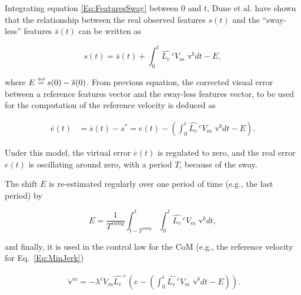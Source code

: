 

Integrating equation \ref{Eq:FeaturesSway} between $0$ and $t$, Dune et al. have shown that the relationship between the real observed features $s(t)$ and the ``sway-less'' features $\bar{s}(t)$ can be written as

\begin{equation}
s(t) = \overline{s}(t) + \int_{0}^{t} {{\widehat{ L_e}}} \, ^c  V_{m} \text{ v}^b dt - E,
\end{equation}

where $E \stackrel{\mbox{\tiny def}}{=} s(0)-\overline{s}(0)$. From previous equation, the corrected visual error between a reference features vector and the sway-less features vector, to be used for the computation of the reference velocity is deduced as

\begin{align}
\overline{e}(t)&=\overline{s}(t) -s^*= e(t) -  (\int_{0}^{t}{ {\widehat{ L_e}}} \, ^c  V_m \text{ v}^b dt -E).
\end{align}

Under this model, the virtual error $\overline{e}(t)$ is regulated to zero, and the real error $e(t)$ is oscillating around zero, with a period $T$, because of the sway.

The shift $E$ is re-estimated regularly over one period of time (e.g., the last period) by 

$$
E= \frac{1}{T^{sway}}\int_{t-T^{sway}}^t\int_0^t { {\widehat{ L_e}}} \, ^c  V_m \text{ v}^b  dt,
$$ 

and finally, it is used in the control law for the CoM (e.g., the reference velocity for Eq.~\ref{Eq:MinJerk}) 

\begin{gather} 
\overline{\text{ v}}^m= -\lambda{ ^c  V_m {{ {\widehat{ L_e}}}}^{+}}(e -  (\int_{0}^{t}{{ {\widehat{ L_e}}}} \, ^c  V_{m}\text{ v}^b dt - E)).
\label{eq:avControlCom} 
\end{gather} 

